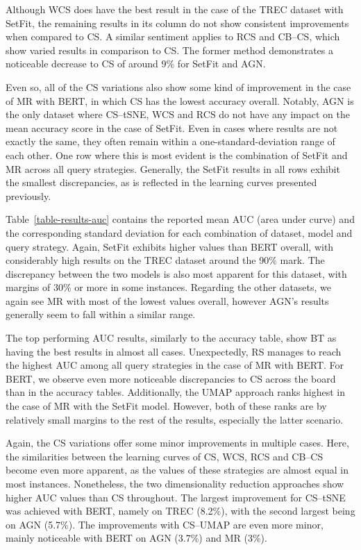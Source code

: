 \documentclass[english,bachelor,ul]{webisthesis} %
\begin{document}
Although WCS does have the best result in the case of the TREC dataset with SetFit, the remaining results in its column do not show consistent improvements when compared to CS. A similar sentiment applies to RCS and CB--CS, which show varied results in comparison to CS. The former method demonstrates a noticeable decrease to CS of around 9\% for SetFit and AGN.

Even so, all of the CS variations also show some kind of improvement in the case of MR with BERT, in which CS has the lowest accuracy overall. Notably, AGN is the only dataset where CS--tSNE, WCS and RCS do not have any impact on the mean accuracy score in the case of SetFit. Even in cases where results are not exactly the same, they often remain within a one-standard-deviation range of each other. One row where this is most evident is the combination of SetFit and MR across all query strategies. Generally, the SetFit results in all rows exhibit the smallest discrepancies, as is reflected in the learning curves presented previously.

Table~\ref{table-results-auc} contains the reported mean AUC (area under curve) and the corresponding standard deviation for each combination of dataset, model and query strategy. Again, SetFit exhibits higher values than BERT overall, with considerably high results on the TREC dataset around the 90\% mark. The discrepancy between the two models is also most apparent for this dataset, with margins of 30\% or more in some instances. Regarding the other datasets, we again see MR with most of the lowest values overall, however AGN's results generally seem to fall within a similar range. 

The top performing AUC results, similarly to the accuracy table, show BT as having the best results in almost all cases. Unexpectedly, RS manages to reach the highest AUC among all query strategies in the case of MR with BERT. For BERT, we observe even more noticeable discrepancies to CS across the board than in the accuracy tables. Additionally, the UMAP approach ranks highest in the case of MR with the SetFit model. However, both of these ranks are by relatively small margins to the rest of the results, especially the latter scenario. 

Again, the CS variations offer some minor improvements in multiple cases. Here, the similarities between the learning curves of CS, WCS, RCS and CB--CS become even more apparent, as the values of these strategies are almost equal in most instances. Nonetheless, the two dimensionality reduction approaches show higher AUC values than CS throughout. The largest improvement for CS--tSNE was achieved with BERT, namely on TREC (8.2\%), with the second largest being on AGN (5.7\%). The improvements with CS--UMAP are even more minor, mainly noticeable with BERT on AGN (3.7\%) and MR (3\%). 
\end{document}
